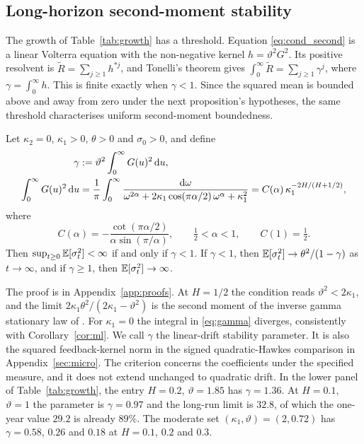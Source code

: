 \subsection{Long-horizon second-moment stability}\label{sec:stability}

The growth of Table~\ref{tab:growth} has a threshold. Equation \eqref{eq:cond_second} is a linear Volterra equation with the non-negative kernel $h=\vartheta^2G^2$. Its positive resolvent is $\widetilde R=\sum_{j\ge1}h^{*j}$, and Tonelli's theorem gives $\int_0^\infty\widetilde R=\sum_{j\ge1}\gamma^j$, where $\gamma=\int_0^\infty h$. This is finite exactly when $\gamma<1$. Since the squared mean is bounded above and away from zero under the next proposition's hypotheses, the same threshold characterises uniform second-moment boundedness.

\begin{proposition}\label{prop:stationarity}
Let $\kappa_2=0$, $\kappa_1>0$, $\theta>0$ and $\sigma_0>0$, and define
\begin{equation}\label{eq:gamma}
\begin{split}
\gamma&:=\vartheta^2\int_0^\infty G(u)^2\,\D u,\\
\int_0^\infty G(u)^2\,\D u&=\frac1\pi\int_0^\infty\frac{\D\omega}{\omega^{2\alpha}+2\kappa_1\cos(\pi\alpha/2)\,\omega^\alpha+\kappa_1^2}=C(\alpha)\,\kappa_1^{-2H/(H+1/2)},
\end{split}
\end{equation}
where
\begin{equation*}
C(\alpha)=-\frac{\cot(\pi\alpha/2)}{\alpha\sin(\pi/\alpha)},\qquad \tfrac12<\alpha<1,\qquad C(1)=\tfrac12.
\end{equation*}
Then $\sup_{t\ge0}\mathbb{E}[\sigma_t^2]<\infty$ if and only if $\gamma<1$. If $\gamma<1$, then $\mathbb{E}[\sigma_t^2]\to\theta^2/(1-\gamma)$ as $t\to\infty$, and if $\gamma\ge1$, then $\mathbb{E}[\sigma_t^2]\to\infty$.
\end{proposition}

The proof is in Appendix~\ref{app:proofs}. At $H=1/2$ the condition reads $\vartheta^2<2\kappa_1$, and the limit $2\kappa_1\theta^2/(2\kappa_1-\vartheta^2)$ is the second moment of the inverse gamma stationary law of \citet{SeppRakhmonov2023}. For $\kappa_1=0$ the integral in \eqref{eq:gamma} diverges, consistently with Corollary~\ref{cor:ml}. We call $\gamma$ the linear-drift stability parameter. It is also the squared feedback-kernel norm in the signed quadratic-Hawkes comparison in Appendix~\ref{sec:micro}. The criterion concerns the coefficients under the specified measure, and it does not extend unchanged to quadratic drift. In the lower panel of Table~\ref{tab:growth}, the entry $H=0.2$, $\vartheta=1.85$ has $\gamma=1.36$. At $H=0.1$, $\vartheta=1$ the parameter is $\gamma=0.97$ and the long-run limit is $32.8$, of which the one-year value $29.2$ is already $89\%$. The moderate set $(\kappa_1,\vartheta)=(2,0.72)$ has $\gamma=0.58$, $0.26$ and $0.18$ at $H=0.1$, $0.2$ and $0.3$.


